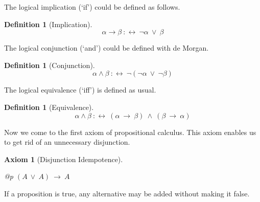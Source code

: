 \documentclass[a4paper,german,10pt,twoside]{book}
\newtheorem{ax}{Axiom}
\theoremstyle{definition}
\newtheorem{defn}[thm]{Definition}
\theoremstyle{remark}
\begin{document}
\par
The logical implication (`if') could be defined as follows.

\begin{defn}[Implication]
\label{definition:implication} \hypertarget{definition:implication}{}
$$\alpha \rightarrow \beta\ :\leftrightarrow \ \neg \alpha\ \lor \ \beta$$

\end{defn}




\par
The logical conjunction (`and') could be defined with de Morgan.

\begin{defn}[Conjunction]
\label{definition:conjunction} \hypertarget{definition:conjunction}{}
$$\alpha \land \beta\ :\leftrightarrow \ \neg (\neg \alpha\ \lor \ \neg \beta)$$

\end{defn}




\par
The logical equivalence (`iff') is defined as usual.

\begin{defn}[Equivalence]
\label{definition:equivalence} \hypertarget{definition:equivalence}{}
$$\alpha \land \beta\ :\leftrightarrow \ (\alpha\ \rightarrow \ \beta)\ \land \ (\beta\ \rightarrow \ \alpha)$$

\end{defn}




\par
Now we come to the first axiom of propositional calculus. This axiom 
enables us to get rid of an unnecessary disjunction.

\begin{ax}[Disjunction Idempotence]
\label{axiom:disjunction_idempotence} \hypertarget{axiom:disjunction_idempotence}{}
\mbox{}
\begin{longtable}{{@{\extracolsep{\fill}}p{\linewidth}}}
\centering $(A\ \lor \ A)\ \rightarrow \ A$
\end{longtable}

\end{ax}




\par
If a proposition is true, any alternative may be added without 
making it false.
\end{document}
